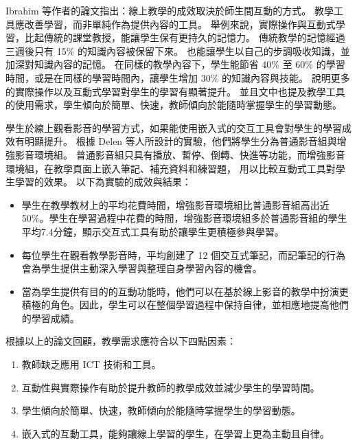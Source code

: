 \documentclass[12pt]{article}
\begin{document}
\begin{enumerate}
\begin{enumerate}
        \par Ibrahim %
        等作者的論文\cite{ref14}指出：線上教學的成效取決於師生間互動的方式。
        教學工具應改善學習，而非單純作為提供內容的工具。
        舉例來說，實際操作與互動式學習，比起傳統的課堂教授，能讓學生保有更持久的記憶力。
        傳統教學的記憶經過三週後只有 15\% 的知識內容被保留下來。
        也能讓學生以自己的步調吸收知識，並加深對知識內容的記憶。
        在同樣的教學內容下，學生能節省 40\% 至 60\% 的學習時間，或是在同樣的學習時間內，讓學生增加 30\% 的知識內容與技能。
        說明更多的實際操作以及互動式學習對學生的學習有顯著提升。
        並且文中也提及教學工具的使用需求，學生傾向於簡單、快速，教師傾向於能隨時掌握學生的學習動態。
        
        \par 學生於線上觀看影音的學習方式，如果能使用嵌入式的交互工具會對學生的學習成效有明顯提升。
        根據 Delen 等人所設計的實驗\cite{ref18}，他們將學生分為普通影音組與增強影音環境組。
        普通影音組只具有播放、暫停、倒轉、快進等功能，而增強影音環境組，在教學頁面上嵌入筆記、補充資料和練習題，
        用以比較互動式工具對學生學習的效果。
        以下為實驗的成效與結果：
        \begin{itemize}
          \item 學生在教學教材上的平均花費時間，增強影音環境組比普通影音組高出近 50\%。學生在學習過程中花費的時間，增強影音環境組多於普通影音組的學生平均7.4分鐘，顯示交互式工具有助於讓學生更積極參與學習。 
          \item 每位學生在觀看教學影音時，平均創建了 12 個交互式筆記，而記筆記的⾏為會為學生提供主動深入學習與整理自身學習內容的機會。 
          \item 當為學生提供有目的的互動功能時，他們可以在基於線上影音的教學中扮演更積極的角色。因此，學生可以在整個學習過程中保持自律，並相應地提高他們的學習成績。
        \end{itemize}

        \par 根據以上的論文回顧，教學需求應符合以下四點因素：
        \begin{enumerate}[label=(\arabic*), itemindent=24pt] %
          \item 教師缺乏應用 ICT 技術和工具。
          \item 互動性與實際操作有助於提升教師的教學成效並減少學生的學習時間。
          \item 學生傾向於簡單、快速，教師傾向於能隨時掌握學生的學習動態。
          \item 嵌入式的互動工具，能夠讓線上學習的學生，在學習上更為主動且自律。
        \end{enumerate}


\end{enumerate}
\end{enumerate}
\end{document}
